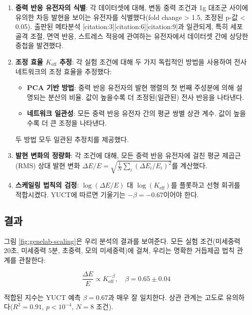 \documentclass[12pt,a4paper]{article}
\theoremstyle{remark}
\newcommand{\Keff}{K_{\mathrm{eff}}}
\begin{document}
	\begin{enumerate}
		\item \textbf{중력 반응 유전자의 식별}: 각 데이터셋에 대해, 변동 중력 조건과 1g 대조군 사이에 유의한 차등 발현을 보이는 유전자를 식별했다(fold change > 1.5, 조정된 p-값 < 0.05). 출판된 메타분석 [citation:3][citation:6][citation:9]과 일관되게, 특히 세포골격 조절, 면역 반응, 스트레스 적응에 관여하는 유전자에서 데이터셋 간에 상당한 중첩을 발견했다.
		
		\item \textbf{조정 효율 \(\Keff\) 추정}: 각 실험 조건에 대해 두 가지 독립적인 방법을 사용하여 전사 네트워크의 조정 효율을 추정했다:
		\begin{itemize}
			\item \textbf{PCA 기반 방법}: 중력 반응 유전자의 발현 행렬의 첫 번째 주성분에 의해 설명되는 분산의 비율. 값이 높을수록 더 조정된(일관된) 전사 반응을 나타낸다.
			\item \textbf{네트워크 일관성}: 모든 중력 반응 유전자 간의 평균 쌍별 상관 계수. 값이 높을수록 더 큰 조정을 나타낸다.
		\end{itemize}
		두 방법 모두 일관된 추정치를 제공했다.
		
		\item \textbf{발현 변화의 정량화}: 각 조건에 대해, 모든 중력 반응 유전자에 걸친 평균 제곱근(RMS) 상대 발현 변화 \(\Delta E/E = \sqrt{\frac{1}{N}\sum_i (\Delta E_i/E_i)^2}\)를 계산했다.
		
		\item \textbf{스케일링 법칙의 검정}: \(\log(\Delta E/E)\) 대 \(\log(\Keff)\)를 플롯하고 선형 회귀를 적합시켰다. YUCT에 따르면 기울기는 \(-\beta = -0.67\)이어야 한다.
	\end{enumerate}
	
	\subsection{결과}
	
	그림 \ref{fig:genelab-scaling}은 우리 분석의 결과를 보여준다. 모든 실험 조건(미세중력 20초, 미세중력 5분, 초중력, 모의 미세중력)에 걸쳐, 우리는 명확한 거듭제곱 법칙 관계를 관찰한다:
	
	\begin{equation}
		\frac{\Delta E}{E} \propto \Keff^{-\beta}, \quad \beta = 0.65 \pm 0.04
		\label{eq:genelab-fit}
	\end{equation}
	
	적합된 지수는 YUCT 예측 \(\beta = 0.67\)과 매우 잘 일치한다. 상관 관계는 고도로 유의하다(\(R^2 = 0.91\), \(p < 10^{-4}\), \(N = 8\) 조건).
	
\end{document}
